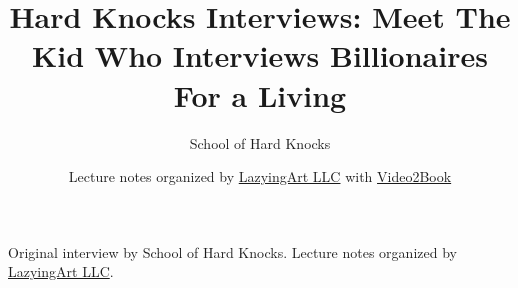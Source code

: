 \documentclass[11pt,oneside]{book}
\begin{document}
\frontmatter
\title{Hard Knocks Interviews: Meet The Kid Who Interviews Billionaires For a Living}
\author{School of Hard Knocks}
\date{Lecture notes organized by \href{https://lazying.art}{LazyingArt LLC} with \href{https://github.com/lachlanchen/Video2Book}{Video2Book}}
\maketitle
\begin{center}
\small Original interview by School of Hard Knocks. Lecture notes organized by \href{https://lazying.art}{LazyingArt LLC}.
\end{center}
\clearpage
\mainmatter

\end{document}
